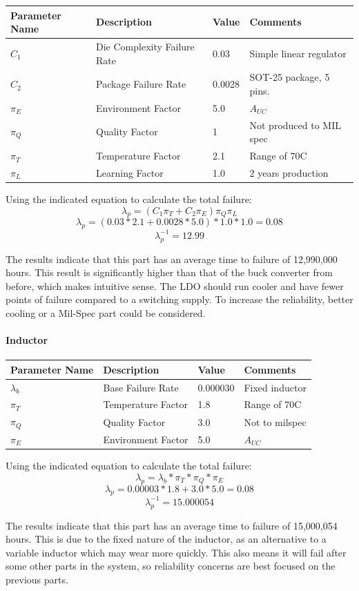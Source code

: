 \documentclass[12pt]{article}
\begin{document}
\begin{table}[htbp!]
\centering
\begin{tabular}{|l|l|l|l|}
\hline
Parameter Name & Description & Value & Comments \\ \hline
$C_1$ & Die Complexity Failure Rate & 0.03 & Simple linear regulator \\ \hline
$C_2$ &  Package Failure Rate & 0.0028 & SOT-25 package, 5 pins. \\ \hline
$\pi_E$ & Environment Factor & 5.0 & $A_{UC}$ \\ \hline
$\pi_Q$ & Quality Factor & 1 & Not produced to MIL spec \\ \hline
$\pi_T$ & Temperature Factor & 2.1 & Range of 70C \\ \hline
$\pi_L$ & Learning Factor & 1.0 & 2 years production \\ \hline
\end{tabular}
\end{table}

\par Using the indicated equation to calculate the total failure:
$$ \lambda_p = (C_1\pi_T + C_2\pi_E) \pi_Q \pi_L$$
$$ \lambda_p = (0.03 * 2.1 + 0.0028 * 5.0) * 1.0 * 1.0 = 0.08 $$
$$ \lambda_p^{-1} = 12.99 $$
\par The results indicate that this part has an average time to failure of 12,990,000 hours.  This result is significantly higher than that of the buck converter from before, which makes intuitive sense. The LDO should run cooler and have fewer points of failure compared to a switching supply. To increase the reliability, better cooling or a Mil-Spec part could be considered.
\newpage
\paragraph{Inductor}
\begin{table}[htbp!]
\centering
\begin{tabular}{|l|l|l|l|}
\hline
Parameter Name & Description & Value & Comments \\ \hline
$\lambda_b$ & Base Failure Rate & 0.000030 & Fixed inductor \\ \hline
$\pi_T$ & Temperature Factor & 1.8 & Range of 70C \\ \hline
$\pi_Q$ & Quality Factor & 3.0 & Not to milspec \\ \hline
$\pi_E$ & Environment Factor & 5.0 & $A_{UC}$ \\ \hline
\end{tabular}
\end{table}
\par Using the indicated equation to calculate the total failure:
$$ \lambda_p = \lambda_b * \pi_T * \pi_Q * \pi_E $$
$$ \lambda_p = 0.00003 * 1.8 + 3.0 * 5.0 = 0.08 $$
$$ \lambda_p^{-1} = 15.000054 $$
\par The results indicate that this part has an average time to failure of 15,000,054 hours.  This is due to the fixed nature of the inductor, as an alternative to a variable inductor which may wear more quickly. This also means it will fail after some other parts in the system, so reliability concerns are best focused on the previous parts.
\end{document}
